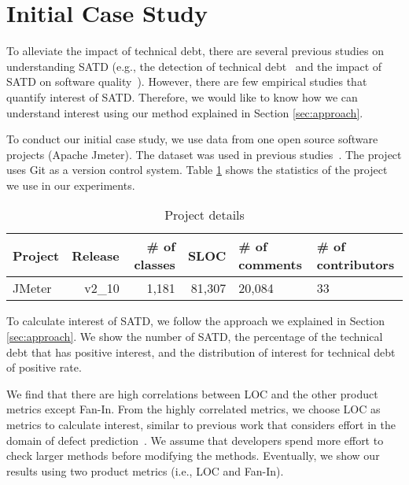 
\section{Initial Case Study} \label{sec:results}
To alleviate the impact of technical debt, there are several previous studies on understanding SATD (e.g., the detection of technical debt~\cite{Potdar2014ICSME,Zazworka2013EASE} and the impact of SATD on software quality~\cite{Wehaibi2016SANER}).
However, there are few empirical studies that quantify interest of SATD.
Therefore, we would like to know how we can understand interest using our method explained in Section \ref{sec:approach}.

To conduct our initial case study, we use data from one open source software projects (Apache Jmeter). The dataset was used in previous studies~\cite{Maldonado2015MTD,Potdar2014ICSME}. The project uses Git as a version control system. Table \ref{tab:project} shows the statistics of the project we use in our experiments. 

\begin{table}[tb]
  \caption{Project details}
  \label{tab:project}
  \centering

  \begin{tabular}{l|rrrp{1.3cm}p{1.3cm}}
  \hline
    Project & Release & \# of classes & SLOC & \# of comments & \# of contributors \\
  \hline
    JMeter & {\sc v2\_10} &   1,181  &  81,307  & 20,084  &  33 \\
  \hline
  \end{tabular}
\end{table}



To calculate interest of SATD, we follow the approach we explained in Section \ref{sec:approach}.
We show the number of SATD, the percentage of the technical debt that has positive interest, and the distribution of interest for technical debt of positive rate.

We find that there are high correlations between LOC and the other product metrics except Fan-In. 
From the highly correlated metrics, we choose LOC as metrics to calculate interest, similar to previous work that considers effort in the domain of defect prediction~\cite{Kamei2010ICSM,Kamei2013TSE}. We assume that developers spend more effort to check larger methods before modifying the methods. Eventually, we show our results using two product metrics (i.e., LOC and Fan-In).

